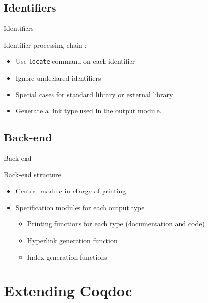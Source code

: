 \documentclass[compress]{beamer}
\newenvironment{tframe}[1]{
  \subsection{#1}
  \begin{frame}{#1}
  }{
  \end{frame}
  }
\begin{document}
  \begin{tframe}{Identifiers}
    Identifier processing chain :
    \begin{itemize}
      \item Use \texttt{locate} command on each identifier
      \item Ignore undeclared identifiers
      \item Special cases for standard library or external library
      \item Generate a link type used in the output module.
    \end{itemize}
  \end{tframe}

  \begin{tframe}{Back-end}
    Back-end structure
    \begin{itemize}
      \item Central module in charge of printing
      \item Specification modules for each output type
        \begin{itemize}
          \item Printing functions for each type (documentation and code)
          \item Hyperlink generation function
          \item Index generation functions
        \end{itemize}
    \end{itemize}
  \end{tframe}

\section{Extending Coqdoc}
\end{document}
